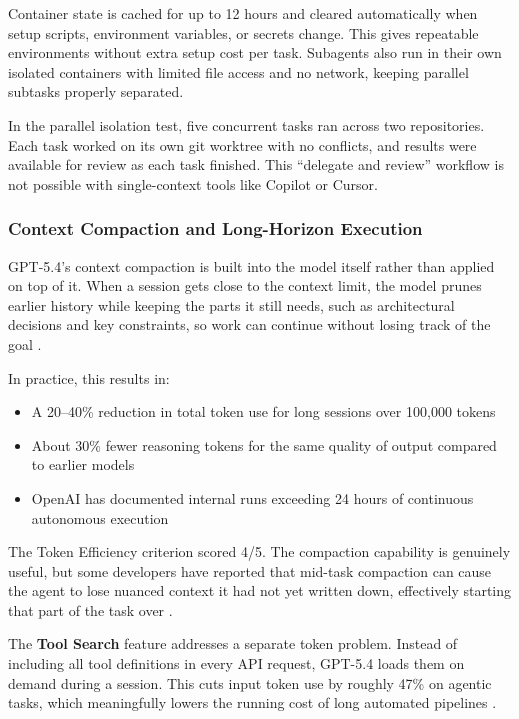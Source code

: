 \documentclass[conference]{IEEEtran}
\begin{document}
Container state is cached for up to 12 hours and cleared automatically when setup scripts, environment variables, or secrets change. This gives repeatable environments without extra setup cost per task. Subagents also run in their own isolated containers with limited file access and no network, keeping parallel subtasks properly separated.

In the parallel isolation test, five concurrent tasks ran across two repositories. Each task worked on its own git worktree with no conflicts, and results were available for review as each task finished. This ``delegate and review'' workflow is not possible with single-context tools like Copilot or Cursor.

\subsubsection{Context Compaction and Long-Horizon Execution}
GPT-5.4's context compaction is built into the model itself rather than applied on top of it. When a session gets close to the context limit, the model prunes earlier history while keeping the parts it still needs, such as architectural decisions and key constraints, so work can continue without losing track of the goal \cite{openai_compaction}.

In practice, this results in:
\begin{itemize}
    \item A 20--40\% reduction in total token use for long sessions over 100,000 tokens
    \item About 30\% fewer reasoning tokens for the same quality of output compared to earlier models
    \item OpenAI has documented internal runs exceeding 24 hours of continuous autonomous execution
\end{itemize}

The Token Efficiency criterion scored 4/5. The compaction capability is genuinely useful, but some developers have reported that mid-task compaction can cause the agent to lose nuanced context it had not yet written down, effectively starting that part of the task over \cite{openai_codex_docs}.

The \textbf{Tool Search} feature addresses a separate token problem. Instead of including all tool definitions in every API request, GPT-5.4 loads them on demand during a session. This cuts input token use by roughly 47\% on agentic tasks, which meaningfully lowers the running cost of long automated pipelines \cite{openai_compaction}.
\end{document}
